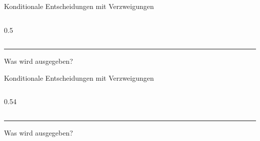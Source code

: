 \begin{frame}[fragile]{Konditionale Entscheidungen mit Verzweigungen}
    \begin{columns}
        \begin{column}{0.5\textwidth}
            
        \end{column}
    \end{columns}
    \vspace{0.5cm}
    \rule{\textwidth}{.5pt}
    \begin{center}
         Was wird ausgegeben?
    \end{center}
\end{frame}

\begin{frame}[fragile]{Konditionale Entscheidungen mit Verzweigungen}
    \begin{columns}
        \begin{column}{0.54\textwidth}
            
        \end{column}
    \end{columns}


    \vspace{0.5cm}
    \rule{\textwidth}{.5pt}
    \begin{center}
         Was wird ausgegeben?
    \end{center}
\end{frame}


